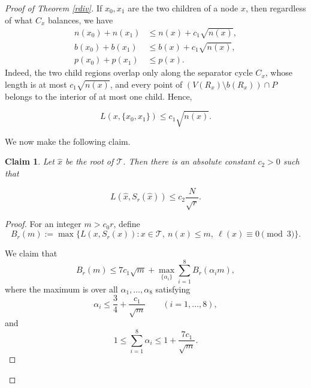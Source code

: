 \documentclass[11pt]{article}
\theoremstyle{plain}
\newtheorem{claim}[theorem]{Claim}
\theoremstyle{definition}
\theoremstyle{remark}
\begin{document}
\begin{proof}[Proof of Theorem \ref{rdiv}]
If \(x_0,x_1\) are the two children of a node \(x\), then regardless of what $C_x$ balances, we have
\begin{align}
n(x_0)+n(x_1) &\le n(x)+c_1\sqrt{n(x)}, \label{eq:n-split-final}\\
b(x_0)+b(x_1) &\le b(x)+c_1\sqrt{n(x)}, \label{eq:b-split-final}\\
p(x_0)+p(x_1) &\le p(x). \label{eq:p-split-final}
\end{align}
Indeed, the two child regions overlap only along the separator cycle \(C_x\), whose length is at most
\(c_1\sqrt{n(x)}\), and every point of \((V(R_x)\setminus b(R_x))\cap P\) belongs to the interior of at
most one child. Hence,



\begin{equation}\label{app}
   L(x,\{x_0,x_1\}) \leq c_1\sqrt{n(x)}. 
\end{equation}


\noindent We now make the following claim.



\begin{claim}\label{eq:L-root-Sr-final}
    Let $\hat x$ be the root of $\mathcal T$.  Then there is an absolute constant $c_2 > 0$ such that 

    $$L(\hat x, S_r(\hat x)) \leq c_2\frac{N}{\sqrt{r}}.$$
\end{claim}

\begin{proof}




 

 For an integer \(m>c_0r\), define
\[
B_r(m):=\max\{L(x,S_r(x)): x\in\mathcal T,\ n(x)\le m,\ \ell(x)\equiv 0\pmod 3\}.
\]

\noindent We claim that
\begin{equation}\label{eq:Br-recurrence-final}
B_r(m)\le 7c_1\sqrt m+\max_{\{\alpha_i\}}\sum_{i=1}^8 B_r(\alpha_i m),
\end{equation}
where the maximum is over all \(\alpha_1,\dots,\alpha_8\) satisfying
\begin{equation}\label{eq:alpha-upper-final}
\alpha_i\le \frac34+\frac{c_1}{\sqrt m}
\qquad (i=1,\dots,8),
\end{equation}
and
\begin{equation}\label{eq:alpha-sum-final}
1\le \sum_{i=1}^8\alpha_i\le 1+\frac{7c_1}{\sqrt m}.
\end{equation}


\end{proof}
\end{proof}
\end{document}
